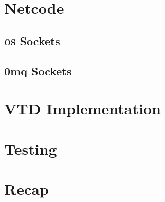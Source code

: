 \section{Netcode}\label{sc:middleware:netcode}

\subsection{\textsc{os} Sockets}

\subsection{0mq Sockets}

\section{VTD Implementation}\label{sc:middleware:implementation}

\section{Testing}\label{sc:middleware:testing}

\section{Recap}\label{sc:middleware:recap}

